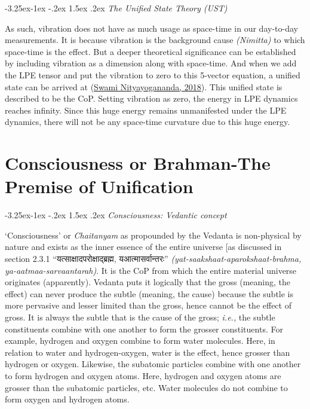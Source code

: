 \documentclass[twoside, 13pt]{article}
\makeatletter
\renewcommand\subsection{\@startsection{subsection}{2}{\z@}%
                                     {-3.25ex\@plus -1ex \@minus -.2ex}%
                                     {1.5ex \@plus .2ex}%
                                     {\normalfont\Large\bfseries}}
\makeatother
\begin{document}
{{\fontsize{8}{10}\selectfont\subsection{\textit{The Unified State Theory (UST)}}}

{\fontsize{12}{14}\selectfont As such, vibration does not have as much usage as space-time in our day-to-day measurements. It is because vibration is the background cause \textit{(Nimitta)} to which space-time is the effect. But a deeper theoretical significance can be established by including vibration as a dimension along with space-time. And when we add the LPE tensor and put the vibration to zero to this 5-vector equation, a unified state can be arrived at (\underline{Swami Nityayogananda, 2018}). This unified state is described to be the CoP. Setting vibration as zero, the energy in LPE dynamics reaches infinity. Since this huge energy remains unmanifested under the LPE dynamics, there will not be any space-time curvature due to this huge energy.}

{\fontsize{18}{20}\selectfont\section{Consciousness or Brahman-The Premise of Unification}}\label{sec-4}

\vspace{-.3cm}

{\fontsize{8}{10}\selectfont\subsection{\textit{Consciousness: Vedantic concept}}}\label{subsec-4.1}

{\fontsize{12}{14}\selectfont ‘Consciousness’ or \textit{Chaitanyam} as propounded by the Vedanta is non-physical by nature and exists as the inner essence of the entire universe [as discussed in section 2.3.1 \foreignlanguage{hindi}{{\fontsize{9}{11}\selectfont “यत्साक्षादपरोक्षाद्ब्रह्म, यआत्मासर्वान्तरः”}} \textit{(yat-saakshaat-aparokshaat-brahma, ya-aatmaa-sarvaantarah)}. It is the CoP from which the entire material universe originates (apparently). Vedanta puts it logically that the gross (meaning, the effect) can never produce the subtle (meaning, the cause) because the subtle is more pervasive and lesser limited than the gross, hence cannot be the effect of gross. It is always the subtle that is the cause of the gross; {\it i.e.,} the subtle constituents combine with one another to form the grosser constituents. For example, hydrogen and oxygen combine to form water molecules. Here, in relation to water and hydrogen-oxygen, water is the effect, hence grosser than hydrogen or oxygen. Likewise, the subatomic particles combine with one another to form hydrogen and oxygen atoms. Here, hydrogen and oxygen atoms are grosser than the subatomic particles, etc. Water molecules do not combine to form oxygen and hydrogen atoms.

}}
\end{document}
